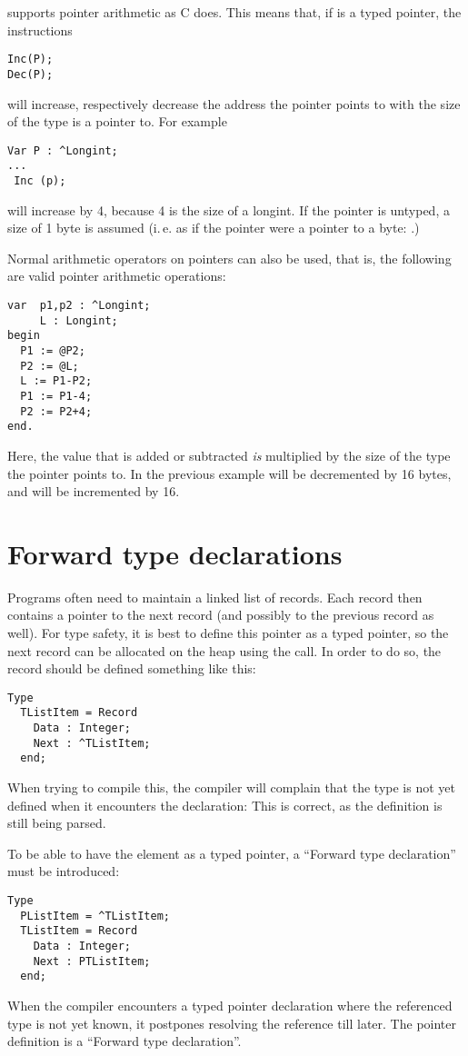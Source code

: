 \fpc supports pointer arithmetic as C does. This means that, if  is a
typed pointer, the instructions
\begin{verbatim}
Inc(P);
Dec(P);
\end{verbatim}
will increase, respectively decrease the address the pointer points to
with the size of the type  is a pointer to. For example
\begin{verbatim}
Var P : ^Longint;
...
 Inc (p);
\end{verbatim}
will increase  by 4, because 4 is the size of a longint. If the
pointer is untyped, a size of 1 byte is assumed (i.\,e. as if the pointer were
a pointer to a byte: .)

Normal arithmetic operators  on pointers can also be used,
that is, the following are valid pointer arithmetic operations:
\begin{verbatim}
var  p1,p2 : ^Longint;
     L : Longint;
begin
  P1 := @P2;
  P2 := @L;
  L := P1-P2;
  P1 := P1-4;
  P2 := P2+4;
end.
\end{verbatim}
Here, the value that is added or subtracted {\em is } multiplied by the
size of the type the pointer points to. In the previous
example  will be decremented by 16 bytes, and
 will be incremented by 16.

\section{Forward type declarations}
Programs often need to maintain a linked list of records. Each record then
contains a pointer to the next record (and possibly to the previous record
as well). For type safety, it is best to define this pointer as a typed
pointer, so the next record can be allocated on the heap using the 
call. In order to do so, the record should be defined something like this:
\begin{verbatim}
Type
  TListItem = Record
    Data : Integer;
    Next : ^TListItem;
  end;
\end{verbatim}
When trying to compile this, the compiler will complain that the
 type is not yet defined when it encounters the 
declaration: This is correct, as the definition is still being parsed.

To be able to have the  element as a typed pointer, a ``Forward
type declaration'' must be introduced:
\begin{verbatim}
Type
  PListItem = ^TListItem;
  TListItem = Record
    Data : Integer;
    Next : PTListItem;
  end;
\end{verbatim}
When the compiler encounters a typed pointer declaration where the
referenced type is not yet known, it postpones resolving the reference till
later. The pointer definition is a ``Forward type declaration''.

